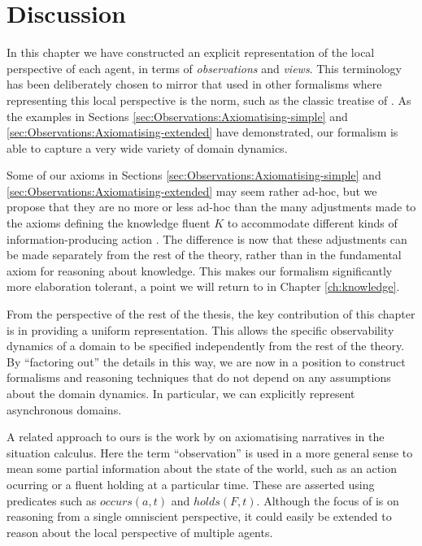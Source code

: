 \section{Discussion\label{sec:Observations:Discussion}}

In this chapter we have constructed an explicit representation of
the local perspective of each agent, in terms of \emph{observations}
and \emph{views}. This terminology has been deliberately chosen to
mirror that used in other formalisms where representing this local
perspective is the norm, such as the classic treatise of \citet{halpern90knowledge_distrib}.
As the examples in Sections \ref{sec:Observations:Axiomatising-simple}
and \ref{sec:Observations:Axiomatising-extended} have demonstrated,
our formalism is able to capture a very wide variety of domain dynamics.

Some of our axioms in Sections \ref{sec:Observations:Axiomatising-simple}
and \ref{sec:Observations:Axiomatising-extended} may seem rather
ad-hoc, but we propose that they are no more or less ad-hoc than the
many adjustments made to the axioms defining the knowledge fluent
$K$ to accommodate different kinds of information-producing action
\citep{shapiro98specifying_ma_systems,Lesperance99sitcalc_approach,shapiro01casl_feat_inter,Petrick06thesis,shapiro07sc_goal_change}.
The difference is now that these adjustments can be made separately
from the rest of the theory, rather than in the fundamental axiom
for reasoning about knowledge. This makes our formalism significantly
more elaboration tolerant, a point we will return to in Chapter \ref{ch:knowledge}.

From the perspective of the rest of the thesis, the key contribution
of this chapter is in providing a uniform representation. This allows
the specific observability dynamics of a domain to be specified independently
from the rest of the theory. By {}``factoring out'' the details
in this way, we are now in a position to construct formalisms and
reasoning techniques that do not depend on any assumptions about the
domain dynamics. In particular, we can explicitly represent asynchronous
domains.

A related approach to ours is the work by \citet{pinto98sc_observations}
on axiomatising narratives in the situation calculus. Here the term
{}``observation'' is used in a more general sense to mean some partial
information about the state of the world, such as an action ocurring
or a fluent holding at a particular time. These are asserted using
predicates such as $occurs(a,t)$ and $holds(F,t)$. Although the
focus of \citep{pinto98sc_observations} is on reasoning from a single
omniscient perspective, it could easily be extended to reason about
the local perspective of multiple agents.

